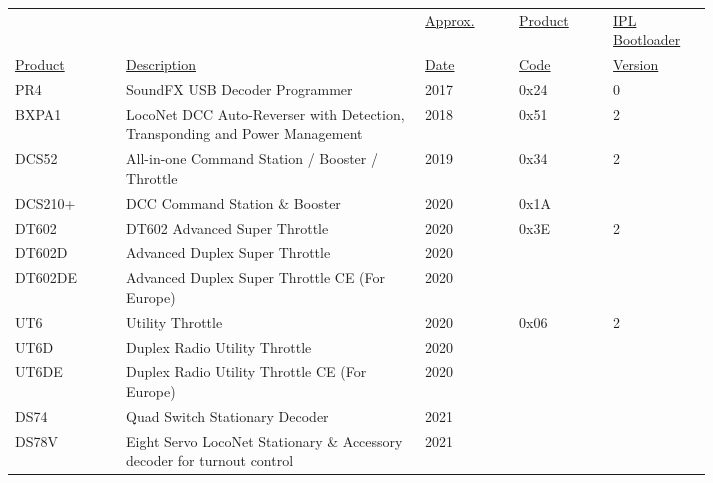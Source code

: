 \newpage
\begin{tabular}{p{0.13\linewidth} p{0.35\linewidth} p{0.11\linewidth} p{0.11\linewidth} p{0.11\linewidth}}
\underline{} & \underline{} & \underline{Approx.} & \underline{Product} & \underline{IPL Bootloader}\\
\underline{Product} & \underline{Description} & \underline{Date} & \underline{Code} & \underline{Version}\\
PR4 & SoundFX USB Decoder Programmer & 2017 & 0x24 & 0\\
BXPA1 & LocoNet DCC Auto-Reverser with Detection, Transponding and Power Management & 2018 & 0x51 & 2\\
DCS52 & All-in-one Command Station / Booster / Throttle & 2019 & 0x34 & 2\\
DCS210+ & DCC Command Station \& Booster  & 2020 & 0x1A & \\
DT602 & DT602 Advanced Super Throttle & 2020 & 0x3E & 2\\
DT602D & Advanced Duplex Super Throttle & 2020 \\
DT602DE & Advanced Duplex Super Throttle CE (For Europe) & 2020 \\
UT6 &  Utility Throttle & 2020 & 0x06 & 2\\
UT6D & Duplex Radio Utility Throttle & 2020 \\
UT6DE & Duplex Radio Utility Throttle CE (For Europe) & 2020 \\
DS74 & Quad Switch Stationary Decoder & 2021 \\
DS78V & Eight Servo LocoNet Stationary \& Accessory decoder for turnout control & 2021 \\
\end{tabular}